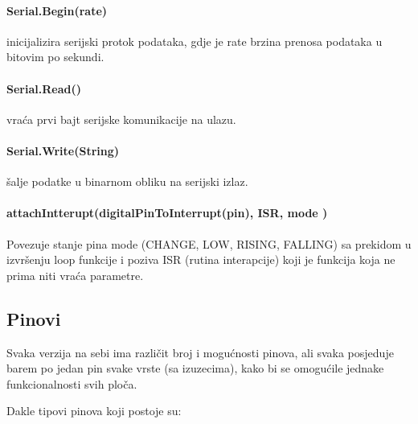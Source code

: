 \documentclass[../Document.tex]{subfiles}
\begin{document}

\paragraph{Serial.Begin(rate)} inicijalizira serijski protok podataka, gdje je rate brzina prenosa podataka u bitovim po sekundi.

\paragraph{Serial.Read()} vraća prvi bajt serijske komunikacije na ulazu.

\paragraph{Serial.Write(String)} šalje podatke u binarnom obliku na serijski izlaz.

\paragraph{attachIntterupt(digitalPinToInterrupt(pin), ISR, mode )} Povezuje stanje pina mode (CHANGE, LOW, RISING, FALLING) sa prekidom u izvršenju loop funkcije i poziva ISR (rutina interapcije) koji je funkcija koja ne prima niti vraća parametre.


\subsection{Pinovi}\label{arduinopinovi}

Svaka verzija na sebi ima različit broj i mogućnosti pinova, ali svaka posjeduje barem po jedan pin svake vrste (sa izuzecima), kako bi se omogućile jednake funkcionalnosti svih ploča.

\noindent Dakle tipovi pinova koji postoje su:
\end{document}
